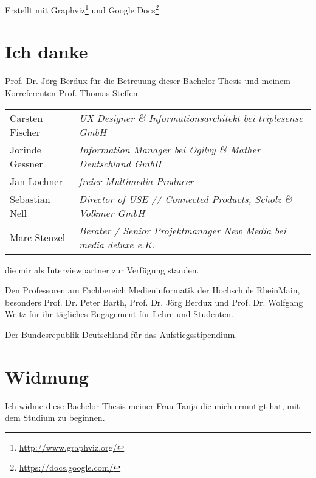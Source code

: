 \documentclass[11pt,a4paper]{article}
\begin{document}
Erstellt mit Graphviz\footnote{\url{http://www.graphviz.org/}} und Google Docs\footnote{\url{https://docs.google.com/}}

\vspace{1cm}

\pagebreak

\section*{Ich danke}

Prof. Dr. Jörg Berdux für die Betreuung dieser Bachelor-Thesis und meinem Korreferenten Prof. Thomas Steffen.

\begin{tabular}{@{}l l}
Carsten Fischer & \emph{UX Designer \& Informationsarchitekt bei triplesense GmbH}\\
Jorinde Gessner & \emph{Information Manager bei Ogilvy \& Mather Deutschland GmbH}\\
Jan Lochner & \emph{freier Multimedia-Producer}\\
Sebastian Nell & \emph{Director of USE // Connected Products, Scholz \& Volkmer GmbH}\\
Marc Stenzel & \emph{Berater / Senior Projektmanager New Media bei media deluxe e.K.}
\end{tabular}

die mir als Interviewpartner zur Verfügung standen.

Den Professoren am Fachbereich Medieninformatik der Hochschule RheinMain, besonders Prof. Dr. Peter Barth, Prof. Dr. Jörg Berdux und Prof. Dr. Wolfgang Weitz für ihr tägliches Engagement für Lehre und Studenten.

Der Bundesrepublik Deutschland für das Aufstiegsstipendium.

\section*{Widmung}

Ich widme diese Bachelor-Thesis meiner Frau Tanja die mich ermutigt hat, mit dem Studium zu beginnen.

\pagebreak



\pagebreak

\tableofcontents

\pagebreak

\setcounter{page}{1}









\pagebreak


\end{document}
